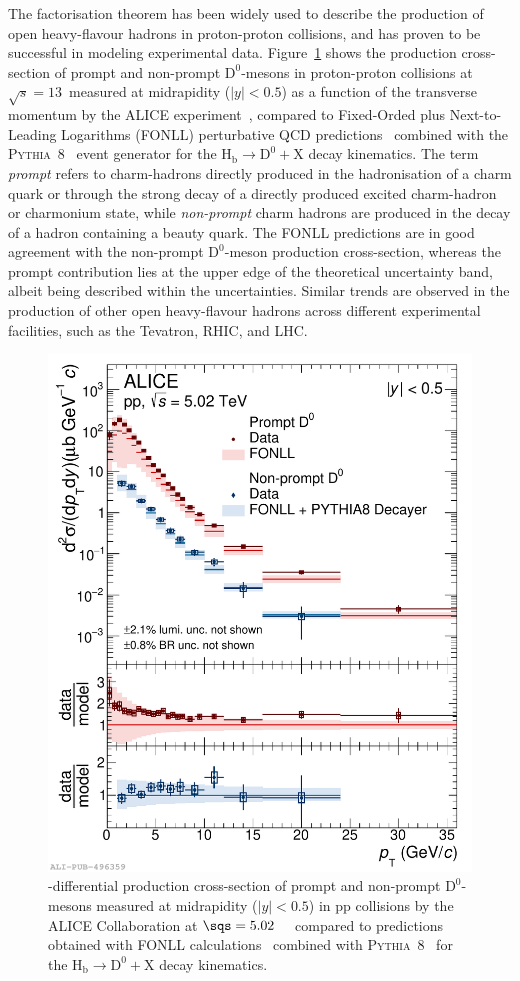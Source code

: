 The factorisation theorem has been widely used to describe the production of open heavy-flavour hadrons in proton-proton collisions, and has proven to be successful in modeling experimental data. Figure~\ref{fig:ppDmeson} shows the production cross-section of prompt and non-prompt $\mathrm{D^0}$-mesons in proton-proton collisions at $\sqrt{s} = 13$~\tev measured at midrapidity ($\lvert y\rvert<0.5$) as a function of the transverse momentum by the ALICE experiment~\cite{ALICE:2021mgk}, compared to Fixed-Orded plus Next-to-Leading Logarithms (FONLL) perturbative QCD predictions~\cite{Cacciari:1998it} combined with the \textsc{Pythia}~8~\cite{Sjostrand:2014zea} event generator for the $\mathrm{H_b \rightarrow D^0+X}$ decay kinematics. The term \emph{prompt} refers to charm-hadrons directly produced in the hadronisation of a charm quark or through the strong decay of a directly produced excited charm-hadron or charmonium state, while \emph{non-prompt} charm hadrons are produced in the decay of a hadron containing a beauty quark. The FONLL predictions are in good agreement with the non-prompt $\mathrm{D^0}$-meson production cross-section, whereas the prompt contribution lies at the upper edge of the theoretical uncertainty band, albeit being described within the uncertainties. Similar trends are observed in the production of other open heavy-flavour hadrons across different experimental facilities, such as the Tevatron, RHIC, and LHC.
\begin{figure}[htb]
    \centering
    \includegraphics[width=0.6\linewidth]{Figures/Chapter 2/CrossSectionD0_Prompt_NonPrompt_pp5TeV_vsFONLL_Pythia8_BRnative_1.pdf}
    \caption{\pt-differential production cross-section of prompt and non-prompt $\mathrm{D^0}$-mesons measured at midrapidity ($\lvert y\rvert<0.5$) in pp collisions by the ALICE Collaboration at $\sqs=5.02$~\tev~\cite{ALICE:2021mgk} compared to predictions obtained with FONLL calculations~\cite{Cacciari:1998it} combined with \textsc{Pythia}~8~\cite{Sjostrand:2014zea} for the $\mathrm{H_b \rightarrow D^0+X}$ decay kinematics.}
    \label{fig:ppDmeson}
\end{figure}

